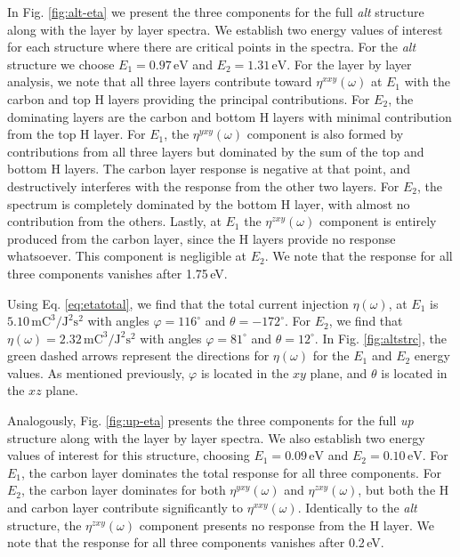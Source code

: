 \documentclass[pss]{wiley2sp} %
\begin{document}
In Fig. \ref{fig:alt-eta} we present the three components for the full
\emph{alt} structure along with the layer by layer spectra. We establish two
energy values of interest for each structure where there are critical points
in the spectra. For the \emph{alt} structure we choose $E_{1} =
0.97\,\mathrm{eV}$ and $E_{2} = 1.31\,\mathrm{eV}$. For the layer by layer
analysis, we note that all three layers contribute toward $\eta^{xxy}(\omega)$
at $E_{1}$ with the carbon and top H layers providing the principal
contributions. For $E_{2}$, the dominating layers are the carbon and bottom H
layers with minimal contribution from the top H layer. For $E_{1}$, the
$\eta^{yxy}(\omega)$ component is also formed by contributions from all three
layers but dominated by the sum of the top and bottom H layers. The carbon
layer response is negative at that point, and destructively interferes with
the response from the other two layers. For $E_{2}$, the spectrum is
completely dominated by the bottom H layer, with almost no contribution from
the others. Lastly, at $E_{1}$ the $\eta^{zxy}(\omega)$ component is entirely
produced from the carbon layer, since the H layers provide no response
whatsoever. This component is negligible at $E_{2}$. We note that the response
for all three components vanishes after 1.75\,eV.

Using Eq. \eqref{eq:etatotal}, we find that the total current injection
$\eta(\omega)$, at $E_{1}$ is
$5.10\,\mathrm{mC}^{3}/\mathrm{J}^{2}\mathrm{s}^{2}$ with angles
$\varphi=116^{\circ}$ and $\theta=-172^{\circ}$. For $E_{2}$, we find that
$\eta(\omega)=2.32\,\mathrm{mC}^{3}/\mathrm{J}^{2}\mathrm{s}^{2}$ with angles
$\varphi=81^{\circ}$ and $\theta=12^{\circ}$. In Fig.
\ref{fig:altstrc}, the green dashed arrows represent the directions for
$\eta(\omega)$ for the $E_{1}$ and $E_{2}$ energy values. As mentioned
previously, $\varphi$ is located in the $xy$ plane, and $\theta$ is located in
the $xz$ plane.

Analogously, Fig. \ref{fig:up-eta} presents the three components for the full
\emph{up} structure along with the layer by layer spectra. We also establish
two energy values of interest for this structure, choosing $E_{1} =
0.09\,\mathrm{eV}$ and $E_{2} = 0.10\,\mathrm{eV}$. For $E_{1}$, the carbon
layer dominates the total response for all three components. For $E_{2}$, the
carbon layer dominates for both $\eta^{yxy}(\omega)$ and $\eta^{zxy}(\omega)$,
but both the H and carbon layer contribute significantly to
$\eta^{xxy}(\omega)$. Identically to the \emph{alt} structure, the
$\eta^{zxy}(\omega)$ component presents no response from the H layer.  We note
that the response for all three components vanishes after 0.2\,eV.
\end{document}
